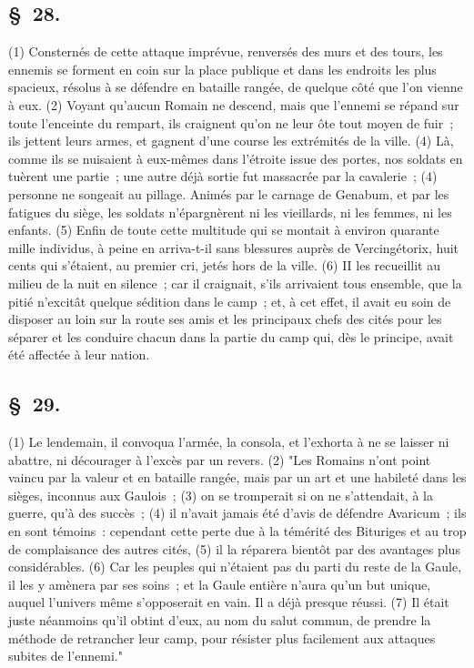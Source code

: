 \documentclass[french,twoside]{book} %
\begin{document}
\subsection[{§ 28.}]{ \textsc{§ 28.} }
\noindent (1) Consternés de cette attaque imprévue, renversés des murs et des tours, les ennemis se forment en coin sur la place publique et dans les endroits les plus spacieux, résolus à se défendre en bataille rangée, de quelque côté que l’on vienne à eux. (2) Voyant qu’aucun Romain ne descend, mais que l’ennemi se répand sur toute l’enceinte du rempart, ils craignent qu’on ne leur ôte tout moyen de fuir ; ils jettent leurs armes, et gagnent d’une course les extrémités de la ville. (4) Là, comme ils se nuisaient à eux-mêmes dans l’étroite issue des portes, nos soldats en tuèrent une partie ; une autre déjà sortie fut massacrée par la cavalerie ; (4) personne ne songeait au pillage. Animés par le carnage de Genabum, et par les fatigues du siège, les soldats n’épargnèrent ni les vieillards, ni les femmes, ni les enfants. (5) Enfin de toute cette multitude qui se montait à environ quarante mille individus, à peine en arriva-t-il sans blessures auprès de Vercingétorix, huit cents qui s’étaient, au premier cri, jetés hors de la ville. (6) II les recueillit au milieu de la nuit en silence ; car il craignait, s’ils arrivaient tous ensemble, que la pitié n’excitât quelque sédition dans le camp ; et, à cet effet, il avait eu soin de disposer au loin sur la route ses amis et les principaux chefs des cités pour les séparer et les conduire chacun dans la partie du camp qui, dès le principe, avait été affectée à leur nation.
\subsection[{§ 29.}]{ \textsc{§ 29.} }
\noindent (1) Le lendemain, il convoqua l’armée, la consola, et l’exhorta à ne se laisser ni abattre, ni décourager à l’excès par un revers. (2) "Les Romains n’ont point vaincu par la valeur et en bataille rangée, mais par un art et une habileté dans les sièges, inconnus aux Gaulois ; (3) on se tromperait si on ne s’attendait, à la guerre, qu’à des succès ; (4) il n’avait jamais été d’avis de défendre Avaricum ; ils en sont témoins : cependant cette perte due à la témérité des Bituriges et au trop de complaisance des autres cités, (5) il la réparera bientôt par des avantages plus considérables. (6) Car les peuples qui n’étaient pas du parti du reste de la Gaule, il les y amènera par ses soins ; et la Gaule entière n’aura qu’un but unique, auquel l’univers même s’opposerait en vain. Il a déjà presque réussi. (7) Il était juste néanmoins qu’il obtint d’eux, au nom du salut commun, de prendre la méthode de retrancher leur camp, pour résister plus facilement aux attaques subites de l’ennemi."
\end{document}
